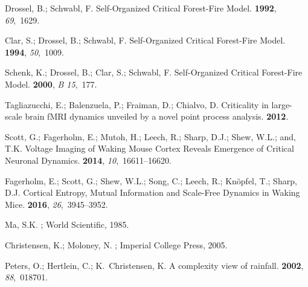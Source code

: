 \documentclass[aps,prl,showpacs,superscriptaddress,groupedaddress,notitlepage]{revtex4-1}
\begin{document}
\begin{thebibliography}{-------}
Drossel, B.; Schwabl, F.
\newblock Self-Organized Critical Forest-Fire Model.
 {\bf 1992}, {\em 69},~1629.

Clar, S.; Drossel, B.; Schwabl, F.
\newblock Self-Organized Critical Forest-Fire Model.
 {\bf 1994}, {\em 50},~1009.

Schenk, K.; Drossel, B.; Clar, S.; Schwabl, F.
\newblock Self-Organized Critical Forest-Fire Model.
 {\bf 2000}, {\em B 15},~177.

Tagliazucchi, E.; Balenzuela, P.; Fraiman, D.; Chialvo, D.
\newblock Criticality in large-scale brain fMRI dynamics unveiled by a novel
  point process analysis.
 {\bf 2012}.

Scott, G.; Fagerholm, E.; Mutoh, H.; Leech, R.; Sharp, D.J.; Shew, W.L.; and,
  T.K.
\newblock Voltage Imaging of Waking Mouse Cortex Reveals Emergence of Critical
  Neuronal Dynamics.
 {\bf 2014}, {\em 10},~16611--16620.

Fagerholm, E.; Scott, G.; Shew, W.L.; Song, C.; Leech, R.; Kn{\"o}pfel, T.;
  Sharp, D.J.
\newblock Cortical Entropy, Mutual Information and Scale-Free Dynamics in
  Waking Mice.
 {\bf 2016}, {\em 26},~3945--3952.

Ma, S.K.
; World Scientific,  1985.

Christensen, K.; Moloney, N.
; Imperial College Press,  2005.

Peters, O.; Hertlein, C.; K.~Christensen, K.
\newblock A complexity view of rainfall.
 {\bf 2002}, {\em 88},~018701.

\end{thebibliography}

 
%
%


\end{document}

